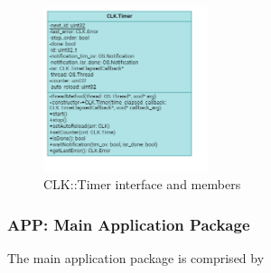\begin{figure}[H]
	\centering
	\includegraphics[width=0.43\textwidth]{./img/navig-class-timer.png}
	\caption {CLK::Timer interface and members}
	\label{fig:navig-class-timer}
	\end{figure}




\subsubsection{APP: Main Application Package}

The main application package is comprised by  

